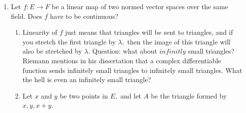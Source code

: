 \documentclass[12pt]{article}
\theoremstyle{definition}
\begin{document}
\begin{enumerate}
\item Let $f: E \to F$ be a linear map of two normed vector spaces over the same field. Does $f$ have to be continuous?
\begin{enumerate}
    \item Linearity of $f$ just means that triangles will be sent to triangles, and if you stretch the first triangle by $\lambda,$ then the image of this triangle will also be stretched by $\lambda.$ Question: what about $infinitly$ small triangles? Riemann mentions in his dissertation that a complex differentiable function sends infinitely small triangles to infinitely small triangles. What the hell is even an infinitely small triangle?
    \item Let $x$ and $y$ be two points in $E,$ and let $A$ be the triangle formed by $x, y, x+y.$
\end{enumerate}
\end{enumerate}
\end{document}
